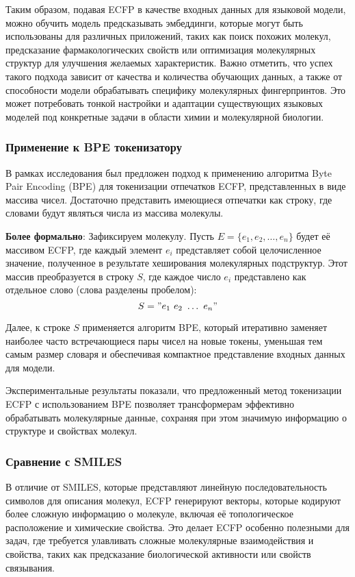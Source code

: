 Таким образом, подавая ECFP в качестве входных данных для языковой модели, можно обучить модель предсказывать эмбеддинги, которые могут быть использованы для различных приложений, таких как поиск похожих молекул, предсказание фармакологических свойств или оптимизация молекулярных структур для улучшения желаемых характеристик.
Важно отметить, что успех такого подхода зависит от качества и количества обучающих данных, а также от способности модели обрабатывать специфику молекулярных фингерпринтов. Это может потребовать тонкой настройки и адаптации существующих языковых моделей под конкретные задачи в области химии и молекулярной биологии.


\subsubsection{Применение к BPE токенизатору}
В рамках исследования был предложен подход к применению алгоритма Byte Pair Encoding (BPE) \cite{sennrich-etal-2016-neural} для токенизации отпечатков ECFP, представленных в виде массива чисел. Достаточно представить имеющиеся отпечатки как строку, где словами будут являться числа из массива молекулы.

\textbf{Более формально}:
Зафиксируем молекулу. Пусть \( E = \{e_1, e_2, \ldots, e_n\} \) будет её массивом ECFP, где каждый элемент \( e_i \) представляет собой целочисленное значение, полученное в результате хеширования молекулярных подструктур. Этот массив преобразуется в строку \( S \), где каждое число \( e_i \) представлено как отдельное слово (слова разделены пробелом):
$$ S = "e_1\ e_2\ \ldots\ e_n" $$

Далее, к строке \( S \) применяется алгоритм BPE, который итеративно заменяет наиболее часто встречающиеся пары чисел на новые токены, уменьшая тем самым размер словаря и обеспечивая компактное представление входных данных для модели.

Экспериментальные результаты показали, что предложенный метод токенизации ECFP с использованием BPE позволяет трансформерам эффективно обрабатывать молекулярные данные, сохраняя при этом значимую информацию о структуре и свойствах молекул.

\subsubsection{Сравнение с SMILES}
В отличие от SMILES, которые представляют линейную последовательность символов для описания молекул, ECFP генерируют векторы, которые кодируют более сложную информацию о молекуле, включая её топологическое расположение и химические свойства. Это делает ECFP особенно полезными для задач, где требуется улавливать сложные молекулярные взаимодействия и свойства, таких как предсказание биологической активности или свойств связывания.

